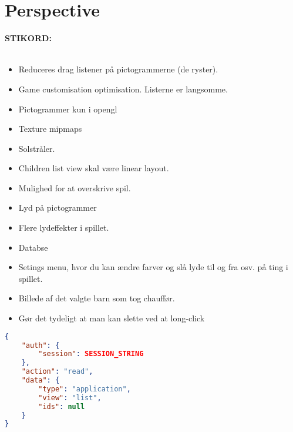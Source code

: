 \chapter{Perspective}
\textbf{STIKORD:}\\\\
\begin{itemize}
\item Reduceres drag listener på pictogrammerne (de ryster).
\item Game customisation optimisation. Listerne er langsomme.
\item Pictogrammer kun i opengl
\item Texture mipmaps
\item Solstråler.
\item Children list view skal være linear layout.
\item Mulighed for at overskrive spil.
\item Lyd på pictogrammer
\item Flere lydeffekter i spillet.
\item Databse 
\item Setings menu, hvor du kan ændre farver og slå lyde til og fra osv. på ting i spillet.
\item Billede af det valgte barn som tog chauffør.
\item Gør det tydeligt at man kan slette ved at long-click
\end{itemize}
\begin{lstlisting}[language=json,firstnumber=1,caption={JSON guery to read application data},label=lst:jsonread]
{
	"auth": {
		"session": SESSION_STRING
	},
	"action": "read",
	"data": {
		"type": "application",
		"view": "list",
		"ids": null
	}
}
\end{lstlisting} 
